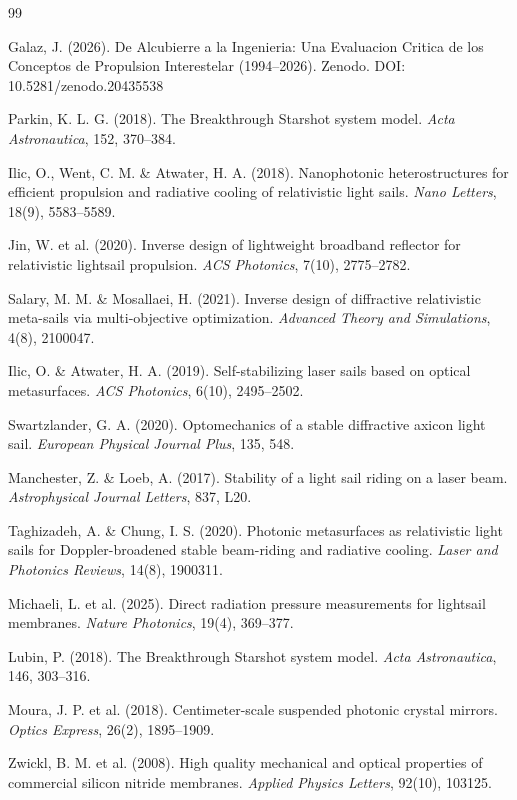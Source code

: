 \documentclass[11pt,a4paper,onecolumn]{article}
\begin{document}
\begin{thebibliography}{99}

 Galaz, J. (2026). De Alcubierre a la Ingenieria: Una Evaluacion Critica de los Conceptos de Propulsion Interestelar (1994--2026). Zenodo. DOI: 10.5281/zenodo.20435538

 Parkin, K. L. G. (2018). The Breakthrough Starshot system model. \textit{Acta Astronautica}, 152, 370--384.

 Ilic, O., Went, C. M. \& Atwater, H. A. (2018). Nanophotonic heterostructures for efficient propulsion and radiative cooling of relativistic light sails. \textit{Nano Letters}, 18(9), 5583--5589.

 Jin, W. et al. (2020). Inverse design of lightweight broadband reflector for relativistic lightsail propulsion. \textit{ACS Photonics}, 7(10), 2775--2782.

 Salary, M. M. \& Mosallaei, H. (2021). Inverse design of diffractive relativistic meta-sails via multi-objective optimization. \textit{Advanced Theory and Simulations}, 4(8), 2100047.

 Ilic, O. \& Atwater, H. A. (2019). Self-stabilizing laser sails based on optical metasurfaces. \textit{ACS Photonics}, 6(10), 2495--2502.

 Swartzlander, G. A. (2020). Optomechanics of a stable diffractive axicon light sail. \textit{European Physical Journal Plus}, 135, 548.

 Manchester, Z. \& Loeb, A. (2017). Stability of a light sail riding on a laser beam. \textit{Astrophysical Journal Letters}, 837, L20.

 Taghizadeh, A. \& Chung, I. S. (2020). Photonic metasurfaces as relativistic light sails for Doppler-broadened stable beam-riding and radiative cooling. \textit{Laser and Photonics Reviews}, 14(8), 1900311.

 Michaeli, L. et al. (2025). Direct radiation pressure measurements for lightsail membranes. \textit{Nature Photonics}, 19(4), 369--377.

 Lubin, P. (2018). The Breakthrough Starshot system model. \textit{Acta Astronautica}, 146, 303--316.

 Moura, J. P. et al. (2018). Centimeter-scale suspended photonic crystal mirrors. \textit{Optics Express}, 26(2), 1895--1909.

 Zwickl, B. M. et al. (2008). High quality mechanical and optical properties of commercial silicon nitride membranes. \textit{Applied Physics Letters}, 92(10), 103125.


\end{thebibliography}
\end{document}
